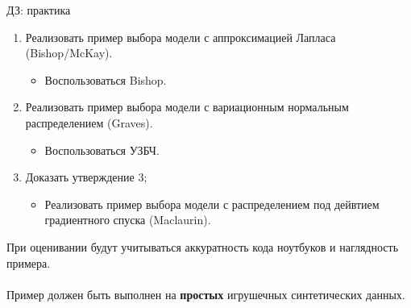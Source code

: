\documentclass[usenames,dvipsnames,10pt,pdf,utf8,russian,aspectratio=43]{beamer}
\begin{document}
\begin{frame}
{ДЗ: практика}
\begin{enumerate}
\item Реализовать пример выбора модели с аппроксимацией Лапласа (Bishop/McKay).
\begin{itemize}
\item Воспользоваться Bishop.
\end{itemize}

\item Реализовать пример выбора модели с вариационным нормальным распределением (Graves).
\begin{itemize}
\item Воспользоваться УЗБЧ.
\end{itemize}

\item Доказать утверждение 3;
\begin{itemize}
\item Реализовать пример выбора модели с распределением под дейвтием градиентного спуска (Maclaurin).
\end{itemize}
\end{enumerate}

При оценивании будут учитываться аккуратность кода ноутбуков и наглядность примера.\\~\\
Пример должен быть выполнен на  \textbf{простых} игрушечных синтетических данных.
\end{frame}
\end{document}

